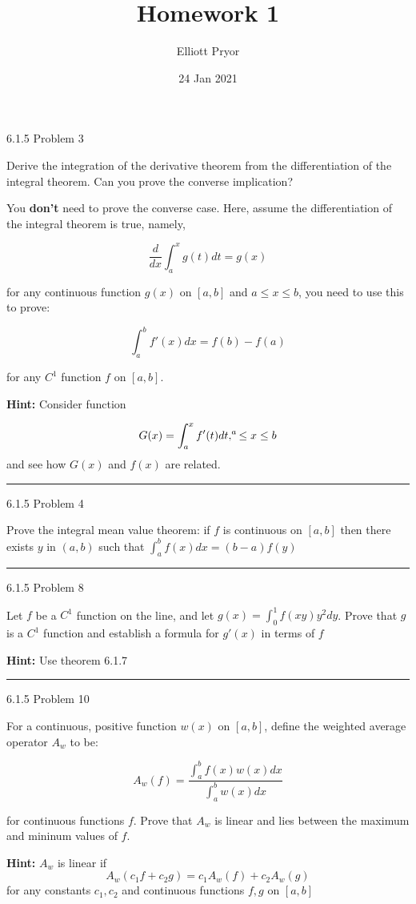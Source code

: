 \documentclass[11pt]{article}
\title{Homework 1}
\author{Elliott Pryor}
\date{24 Jan 2021}
\begin{document}
\maketitle

 6.1.5 Problem 3

Derive the integration of the derivative theorem from the differentiation of 
the integral theorem. Can you prove the converse implication?

You \textbf{don't} need to prove the converse case. Here, assume the differentiation of the integral
theorem is true, namely,

$$\frac{d}{dx} \int_a ^x g(t) dt = g(x)$$

for any continuous function $g(x)$ on $[a,b]$ and $a \leq x \leq b$, you need to use this to prove:

$$\int_a ^b f'(x) dx = f(b) - f(a)$$

for any $C^1$ function $f$ on $[a,b]$.

\textbf{Hint:} Consider function

$$G(x) = \int_a ^x f'(t)dt, \sp a \leq x \leq b$$
and see how $G(x)$ and $f(x)$ are related.
\hrule









 6.1.5 Problem 4

Prove the integral mean value theorem: if $f$ is continuous on $[a,b]$ then there exists $y$ in $(a,b)$ 
such that $\int_a ^b f(x) dx = (b - a)f(y)$
\hrule








 6.1.5 Problem 8

Let $f$ be a $C^1$ function on the line, and let $g(x) = \int_0 ^1 f(xy)y^2 dy$.
Prove that $g$ is a $C^1$ function and establish a formula for $g'(x)$ in terms of $f$

\textbf{Hint:} Use theorem 6.1.7
\hrule





 6.1.5 Problem 10

For a continuous, positive function $w(x)$ on $[a,b]$, define the weighted average operator $A_w$ to be:

$$A_w(f) = \frac{ \int_a ^b f(x) w(x) dx }{ \int_a ^b w(x) dx}$$

for continuous functions $f$. Prove that $A_w$ is linear and lies between the maximum and mininum values of $f$.

\textbf{Hint:} $A_w$ is linear if
$$A_w (c_1 f + c_2 g) = c_1 A_w (f) + c_2 A_w (g)$$
for any constants $c_1, c_2$ and continuous functions $f,g$ on $[a,b]$
\end{document}

